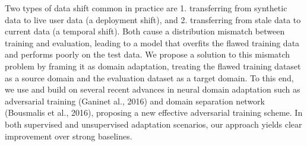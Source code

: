 Two types of data shift common in practice are 1. transferring from synthetic data to live user data (a deployment shift), and 2. transferring from stale data to current data (a temporal shift). Both cause a distribution mismatch between training and evaluation, leading to a model that overfits the flawed training data and performs poorly on the test data. We propose a solution to this mismatch problem by framing it as domain adaptation, treating the flawed training dataset as a source domain and the evaluation dataset as a target domain. To this end, we use and build on several recent advances in neural domain adaptation such as adversarial training (Ganinet al., 2016) and domain separation network (Bousmalis et al., 2016), proposing a new effective adversarial training scheme. In both supervised and unsupervised adaptation scenarios, our approach yields clear improvement over strong baselines.
